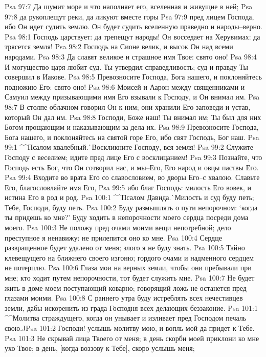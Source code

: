 Psa 97:7  Да шумит море и что наполняет его, вселенная и живущие в ней;
Psa 97:8  да рукоплещут реки, да ликуют вместе горы
Psa 97:9  пред лицем Господа, ибо Он идет судить землю. Он будет судить вселенную праведно и народы--верно.
Psa 98:1  Господь царствует: да трепещут народы! Он восседает на Херувимах: да трясется земля!
Psa 98:2  Господь на Сионе велик, и высок Он над всеми народами.
Psa 98:3  Да славят великое и страшное имя Твое: свято оно!
Psa 98:4  И могущество царя любит суд. Ты утвердил справедливость; суд и правду Ты совершил в Иакове.
Psa 98:5  Превозносите Господа, Бога нашего, и поклоняйтесь подножию Его: свято оно!
Psa 98:6  Моисей и Аарон между священниками и Самуил между призывающими имя Его взывали к Господу, и Он внимал им.
Psa 98:7  В столпе облачном говорил Он к ним; они хранили Его заповеди и устав, который Он дал им.
Psa 98:8  Господи, Боже наш! Ты внимал им; Ты был для них Богом прощающим и наказывающим за дела их.
Psa 98:9  Превозносите Господа, Бога нашего, и поклоняйтесь на святой горе Его, ибо свят Господь, Бог наш.
Psa 99:1  ^^Псалом хвалебный.^^ Воскликните Господу, вся земля!
Psa 99:2  Служите Господу с веселием; идите пред лице Его с восклицанием!
Psa 99:3  Познайте, что Господь есть Бог, что Он сотворил нас, и мы--Его, Его народ и овцы паствы Его.
Psa 99:4  Входите во врата Его со славословием, во дворы Его--с хвалою. Славьте Его, благословляйте имя Его,
Psa 99:5  ибо благ Господь: милость Его вовек, и истина Его в род и род.
Psa 100:1  ^^Псалом Давида.^^ Милость и суд буду петь; Тебе, Господи, буду петь.
Psa 100:2  Буду размышлять о пути непорочном: `когда ты придешь ко мне?' Буду ходить в непорочности моего сердца посреди дома моего.
Psa 100:3  Не положу пред очами моими вещи непотребной; дело преступное я ненавижу: не прилепится оно ко мне.
Psa 100:4  Сердце развращенное будет удалено от меня; злого я не буду знать.
Psa 100:5  Тайно клевещущего на ближнего своего изгоню; гордого очами и надменного сердцем не потерплю.
Psa 100:6  Глаза мои на верных земли, чтобы они пребывали при мне; кто ходит путем непорочности, тот будет служить мне.
Psa 100:7  Не будет жить в доме моем поступающий коварно; говорящий ложь не останется пред глазами моими.
Psa 100:8  С раннего утра буду истреблять всех нечестивцев земли, дабы искоренить из града Господня всех делающих беззаконие.
Psa 101:1  ^^Молитва страждущего, когда он унывает и изливает пред Господом печаль свою.^^
Psa 101:2  Господи! услышь молитву мою, и вопль мой да придет к Тебе.
Psa 101:3  Не скрывай лица Твоего от меня; в день скорби моей приклони ко мне ухо Твое; в день, [когда воззову к Тебе], скоро услышь меня;

